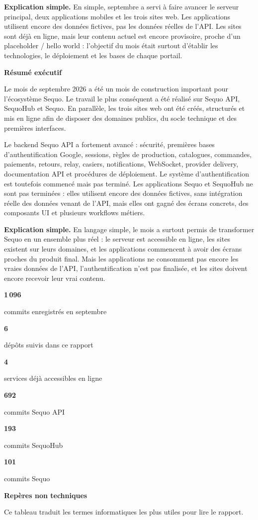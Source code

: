 \documentclass[11pt,letterpaper]{article}
\newcommand{\sectiontitle}[1]{%
  \vspace{0.55em}
  {\Large\bfseries\color{SequoInk}#1}\par
  \vspace{0.1em}
}
\newcommand{\simpleexplanation}[1]{%
  {\small\textbf{\color{SequoBlue}Explication simple.} \color{SequoMuted}#1\par}
}
\newcommand{\metric}[2]{%
  \begin{minipage}[t]{0.30\linewidth}
    {\LARGE\bfseries\color{SequoGreen}#1}\par
    {\small\color{SequoMuted}#2}
  \end{minipage}
}
\begin{document}
\simpleexplanation{En simple, septembre a servi à faire avancer le serveur principal, deux applications mobiles et les trois sites web. Les applications utilisent encore des données fictives, pas les données réelles de l'API. Les sites sont déjà en ligne, mais leur contenu actuel est encore provisoire, proche d'un placeholder / hello world : l'objectif du mois était surtout d'établir les technologies, le déploiement et les bases de chaque portail.}

\sectiontitle{Résumé exécutif}
Le mois de septembre 2026 a été un mois de construction important pour l'écosystème Sequo. Le travail le plus conséquent a été réalisé sur Sequo API, SequoHub et Sequo. En parallèle, les trois sites web ont été créés, structurés et mis en ligne afin de disposer des domaines publics, du socle technique et des premières interfaces.

Le backend Sequo API a fortement avancé : sécurité, premières bases d'authentification Google, sessions, règles de production, catalogues, commandes, paiements, retours, relay, casiers, notifications, WebSocket, provider delivery, documentation API et procédures de déploiement. Le système d'authentification est toutefois commencé mais pas terminé. Les applications Sequo et SequoHub ne sont pas terminées : elles utilisent encore des données fictives, sans intégration réelle des données venant de l'API, mais elles ont gagné des écrans concrets, des composants UI et plusieurs workflows métiers.

\simpleexplanation{En langage simple, le mois a surtout permis de transformer Sequo en un ensemble plus réel : le serveur est accessible en ligne, les sites existent sur leurs domaines, et les applications commencent à avoir des écrans proches du produit final. Mais les applications ne consomment pas encore les vraies données de l'API, l'authentification n'est pas finalisée, et les sites doivent encore recevoir leur vrai contenu.}

\vspace{0.45em}
\noindent
\metric{1\,096}{commits enregistrés en septembre}
\hfill
\metric{6}{dépôts suivis dans ce rapport}
\hfill
\metric{4}{services déjà accessibles en ligne}
\par\vspace{0.65em}
\noindent
\metric{692}{commits Sequo API}
\hfill
\metric{193}{commits SequoHub}
\hfill
\metric{101}{commits Sequo}

\sectiontitle{Repères non techniques}
Ce tableau traduit les termes informatiques les plus utiles pour lire le rapport.
\end{document}
